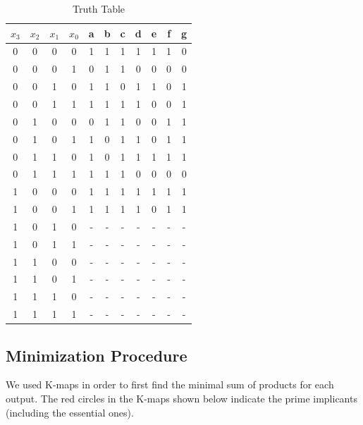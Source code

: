 \documentclass{article}
\begin{document}
\begin{table} [h!]
\begin{center}
\begin{tabular}{ c c c c | c c c c c c c }
\centering

  $x_3$ & $x_2$ & $x_1$ & $x_0$ & a & b & c & d & e & f & g \\
  \hline
  0     & 0     & 0     & 0     & 1 & 1 & 1 & 1 & 1 & 1 & 0 \\
  0     & 0     & 0     & 1     & 0 & 1 & 1 & 0 & 0 & 0 & 0 \\
  0     & 0     & 1     & 0     & 1 & 1 & 0 & 1 & 1 & 0 & 1 \\
  0     & 0     & 1     & 1     & 1 & 1 & 1 & 1 & 0 & 0 & 1 \\
  0     & 1     & 0     & 0     & 0 & 1 & 1 & 0 & 0 & 1 & 1 \\
  0     & 1     & 0     & 1     & 1 & 0 & 1 & 1 & 0 & 1 & 1 \\
  0     & 1     & 1     & 0     & 1 & 0 & 1 & 1 & 1 & 1 & 1 \\
  0     & 1     & 1     & 1     & 1 & 1 & 1 & 0 & 0 & 0 & 0 \\
  1     & 0     & 0     & 0     & 1 & 1 & 1 & 1 & 1 & 1 & 1 \\
  1     & 0     & 0     & 1     & 1 & 1 & 1 & 1 & 0 & 1 & 1 \\
  1     & 0     & 1     & 0     & - & - & - & - & - & - & - \\
  1     & 0     & 1     & 1     & - & - & - & - & - & - & - \\
  1     & 1     & 0     & 0     & - & - & - & - & - & - & - \\
  1     & 1     & 0     & 1     & - & - & - & - & - & - & - \\
  1     & 1     & 1     & 0     & - & - & - & - & - & - & - \\
  1     & 1     & 1     & 1     & - & - & - & - & - & - & - \\

\end{tabular}
\caption{Truth Table}
\end{center}
\label{table:3}
\end{table}


\subsection{Minimization Procedure}
We used K-maps in order to first find the minimal sum of products for each 
output. The red circles in the K-maps shown below indicate the prime 
implicants (including the essential ones).\\
\end{document}
